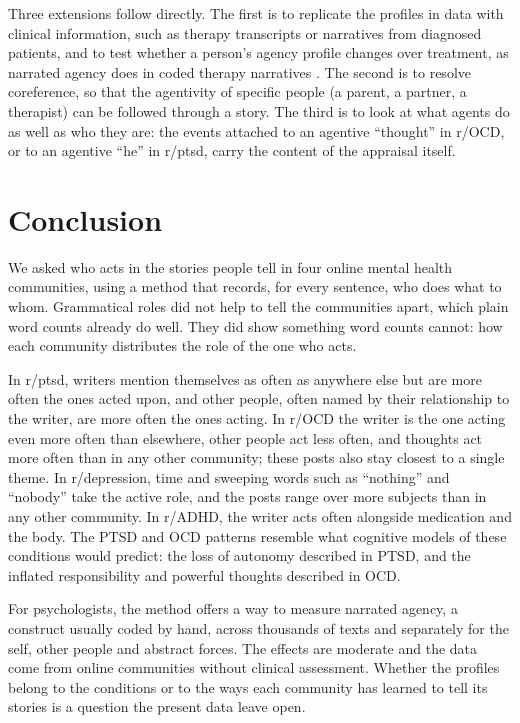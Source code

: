 \documentclass[11pt,a4paper]{article}
\begin{document}
Three extensions follow directly. The first is to replicate the profiles in data with clinical information, such as therapy transcripts or narratives from diagnosed patients, and to test whether a person's agency profile changes over treatment, as narrated agency does in coded therapy narratives \citep{adler2012}. The second is to resolve coreference, so that the agentivity of specific people (a parent, a partner, a therapist) can be followed through a story. The third is to look at what agents do as well as who they are: the events attached to an agentive ``thought'' in r/OCD, or to an agentive ``he'' in r/ptsd, carry the content of the appraisal itself.

\section{Conclusion}

We asked who acts in the stories people tell in four online mental health communities, using a method that records, for every sentence, who does what to whom. Grammatical roles did not help to tell the communities apart, which plain word counts already do well. They did show something word counts cannot: how each community distributes the role of the one who acts.

In r/ptsd, writers mention themselves as often as anywhere else but are more often the ones acted upon, and other people, often named by their relationship to the writer, are more often the ones acting. In r/OCD the writer is the one acting even more often than elsewhere, other people act less often, and thoughts act more often than in any other community; these posts also stay closest to a single theme. In r/depression, time and sweeping words such as ``nothing'' and ``nobody'' take the active role, and the posts range over more subjects than in any other community. In r/ADHD, the writer acts often alongside medication and the body. The PTSD and OCD patterns resemble what cognitive models of these conditions would predict: the loss of autonomy described in PTSD, and the inflated responsibility and powerful thoughts described in OCD.

For psychologists, the method offers a way to measure narrated agency, a construct usually coded by hand, across thousands of texts and separately for the self, other people and abstract forces. The effects are moderate and the data come from online communities without clinical assessment. Whether the profiles belong to the conditions or to the ways each community has learned to tell its stories is a question the present data leave open.
\end{document}
